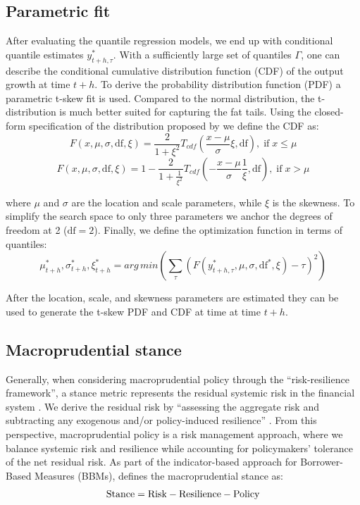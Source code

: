 \documentclass[12pt,a4paper]{article}
\begin{document}
\subsection{Parametric fit}
After evaluating the quantile regression models, we end up with conditional quantile estimates $y_{t+h, \tau}^*$. With a sufficiently large set of quantiles $\Gamma$, one can describe the conditional cumulative distribution function (CDF) of the output growth at time $t+h$. To derive the probability distribution function (PDF) a parametric t-skew fit \citep{adrian_2019} is used. Compared to the normal distribution, the t-distribution is much better suited for capturing the fat tails. Using the closed-form specification of the distribution proposed by \citet{giot2003} we define the CDF as:
\begin{equation}
    \label{eq:tskew_cdf_n}
    F(x, \mu, \sigma, \text{df}, \xi) = \frac{2}{1+\xi^2} T_{cdf}\left(\frac{x-\mu}{\sigma}\xi, \text{df}\right), \;\text{if}\; x \leq \mu 
\end{equation}
\begin{equation}
    \label{eq:tskew_cdf_p}
    F(x, \mu, \sigma, \text{df}, \xi) = 1 - \frac{2}{1+\frac{1}{\xi^2}} T_{cdf}\left(-\frac{x-\mu}{\sigma}\frac{1}{\xi}, \text{df}\right), \;\text{if}\; x > \mu 
\end{equation}

where $\mu$ and $\sigma$ are the location and scale parameters, while $\xi$ is the skewness. To simplify the search space to only three parameters we anchor the degrees of freedom at 2 ($\text{df}=2$). Finally, we define the optimization function in terms of quantiles:
\begin{equation}
    \label{eq:tskew_cdf_loss}
    \mu_{t+h}^*, \sigma_{t+h}^*, \xi_{t+h}^* = arg\,min\left(\sum_\tau \left(F(y_{t+h, \tau}^*, \mu, \sigma, \text{df}^*, \xi)-\tau\right)^2\right)
\end{equation}

After the location, scale, and skewness parameters are estimated they can be used to generate the t-skew PDF and CDF at time at time $t+h$.

\subsection{Macroprudential stance}
Generally, when considering macroprudential policy through the ``risk-resilience framework'', a stance metric represents the residual systemic risk in the financial system \citep{esrb2019}. We derive the residual risk by ``assessing the aggregate risk and subtracting any exogenous and/or policy-induced resilience'' \citep{esrb2021}. From this perspective, macroprudential policy is a risk management approach, where we balance systemic risk and resilience while accounting for policymakers' tolerance of the net residual risk. As part of the indicator-based approach for Borrower-Based Measures (BBMs), \citet{esrb2024} defines the macroprudential stance as:
\begin{equation}
    \label{eq:stance}
    \textnormal{Stance} = \textnormal{Risk} - \textnormal{Resilience} - \textnormal{Policy}
\end{equation}
\end{document}

